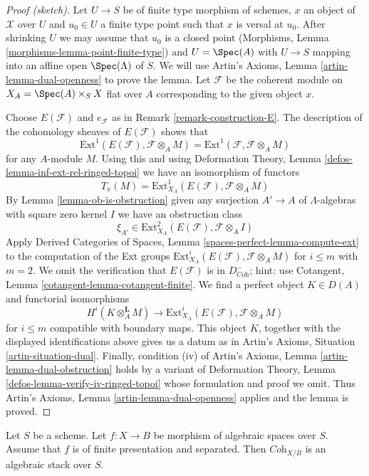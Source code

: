\begin{proof}[Proof (sketch)]
Let $U \to S$ be of finite type morphism of schemes, $x$ an object of
$\mathcal{X}$ over $U$ and $u_0 \in U$ a finite type point such that
$x$ is versal at $u_0$. After shrinking $U$ we may assume that $u_0$
is a closed point (Morphisms, Lemma \ref{morphisms-lemma-point-finite-type})
and $U = \Spec(A)$ with $U \to S$ mapping into an
affine open $\Spec(\Lambda)$ of $S$. We will use
Artin's Axioms, Lemma \ref{artin-lemma-dual-openness} to prove the lemma.
Let $\mathcal{F}$ be the coherent module on $X_A = \Spec(A) \times_S X$
flat over $A$ corresponding to the given object $x$.

\medskip\noindent
Choose $E(\mathcal{F})$ and $e_\mathcal{F}$ as in
Remark \ref{remark-construction-E}.
The description of the cohomology sheaves of $E(\mathcal{F})$ shows
that
$$
\text{Ext}^1(E(\mathcal{F}), \mathcal{F} \otimes_A M) =
\text{Ext}^1(\mathcal{F}, \mathcal{F} \otimes_A M)
$$
for any $A$-module $M$. Using this and using
Deformation Theory, Lemma \ref{defos-lemma-inf-ext-rel-ringed-topoi}
we have an isomorphism of functors
$$
T_x(M) = \text{Ext}^1_{X_A}(E(\mathcal{F}), \mathcal{F} \otimes_A M)
$$
By Lemma \ref{lemma-ob-is-obstruction} given any surjection $A' \to A$
of $\Lambda$-algebras with square zero kernel $I$ we have an obstruction class
$$
\xi_{A'} \in \text{Ext}^2_{X_A}(E(\mathcal{F}), \mathcal{F} \otimes_A I)
$$
Apply Derived Categories of Spaces, Lemma
\ref{spaces-perfect-lemma-compute-ext}
to the computation of the Ext groups
$\text{Ext}^i_{X_A}(E(\mathcal{F}), \mathcal{F} \otimes_A M)$
for $i \leq m$ with $m = 2$. We omit the verification that
$E(\mathcal{F})$ is in $D^-_{\textit{Coh}}$; hint: use
Cotangent, Lemma \ref{cotangent-lemma-cotangent-finite}.
We find a perfect object $K \in D(A)$
and functorial isomorphisms
$$
H^i(K \otimes_A^\mathbf{L} M)
\longrightarrow
\text{Ext}^i_{X_A}(E(\mathcal{F}), \mathcal{F} \otimes_A M)
$$
for $i \leq m$ compatible with boundary maps. This object $K$, together
with the displayed identifications above gives us a datum as in
Artin's Axioms, Situation \ref{artin-situation-dual}.
Finally, condition (iv) of
Artin's Axioms, Lemma \ref{artin-lemma-dual-obstruction}
holds by a variant of
Deformation Theory, Lemma \ref{defos-lemma-verify-iv-ringed-topoi}
whose formulation and proof we omit.
Thus Artin's Axioms, Lemma \ref{artin-lemma-dual-openness}
applies and the lemma is proved.
\end{proof}

\begin{theorem}
\label{theorem-coherent-algebraic-general}
Let $S$ be a scheme. Let $f : X \to B$ be morphism of algebraic spaces
over $S$. Assume that $f$ is of finite presentation and separated. Then
$\textit{Coh}_{X/B}$ is an algebraic stack over $S$.
\end{theorem}

